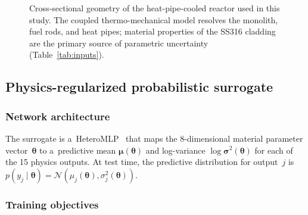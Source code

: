 \documentclass[pdflatex,sn-mathphys-num]{sn-jnl}
\theoremstyle{thmstyleone}
\theoremstyle{thmstyletwo}
\theoremstyle{thmstylethree}
\begin{document}
\begin{figure}[ht]
  \centering
  \caption{%
    Cross-sectional geometry of the heat-pipe-cooled reactor used in this study.
    The coupled thermo-mechanical model resolves the monolith, fuel rods, and
    heat pipes; material properties of the SS316 cladding are the primary
    source of parametric uncertainty (Table~\ref{tab:inputs}).
  }\label{fig:hpr_geometry}
\end{figure}

\subsection{Physics-regularized probabilistic surrogate}\label{sec:surrogate}


\subsubsection{Network architecture}

The surrogate is a~HeteroMLP~\cite{ref:heteromlp} that maps the
8-dimensional material parameter vector~$\bm{\theta}$ to a~predictive mean
$\bm{\mu}(\bm{\theta})$ and log-variance $\log\bm{\sigma}^2(\bm{\theta})$ for each
of the 15 physics outputs.
At test time, the predictive distribution for output~$j$ is
$p(y_j \mid \bm{\theta}) = \mathcal{N}(\mu_j(\bm{\theta}), \sigma_j^2(\bm{\theta}))$.

\subsubsection{Training objectives}
\end{document}
